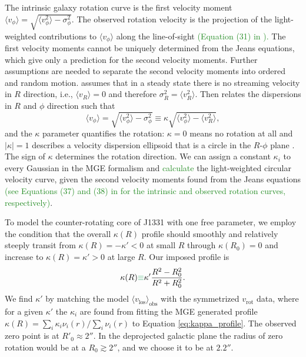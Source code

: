 \documentclass[useAMS,usenatbib]{mnras}
\newcommand*\diff{\mathop{}\!\mathrm{d}}
\newcommand{\NEW}[1]{\textcolor{ForestGreen}{#1}}
\newcommand{\OLD}[1]{}
\begin{document}
The intrinsic galaxy rotation curve is the first velocity moment $\langle v_\phi\rangle = \sqrt{\langle v_\phi^2 \rangle - \sigma_\phi^2}$. The observed rotation velocity is the projection of the light-weighted contributions to $\langle v_\phi\rangle$ along the line-of-sight \NEW{(Equation (31) in \citep{Cap08}).} \OLD{\citep{Cap08},
\begin{equation*}
I \langle v_\text{los}\rangle = \int_{-\infty}^{+\infty} \nu \langle v_\phi\rangle \cos \phi \sin i \diff z'.
\end{equation*}}
The first velocity moments cannot be uniquely determined from the Jeans equations, which give only a prediction for the second velocity moments. Further assumptions are needed to separate the second velocity moments into ordered and random motion. \citet{Cap08} assumes that in a steady state there is no streaming velocity in $R$ direction, i.e., $\langle v_R \rangle = 0$ and therefore $\sigma_R^2 = \langle v_R^2 \rangle$. Then \citet{Cap08} relates the dispersions in $R$ and $\phi$ direction such that
\begin{equation}
\langle v_\phi\rangle = \sqrt{\langle v_\phi^2 \rangle - \sigma_\phi^2} \equiv \kappa \sqrt{\langle v_\phi^2 \rangle - \langle v_R^2 \rangle},
\end{equation}
and the $\kappa$ parameter quantifies the rotation: $\kappa = 0$ means no rotation at all and $|\kappa| = 1$ describes a velocity dispersion ellipsoid that is a circle in the $R$-$\phi$ plane \citep{Cap08}. The sign of $\kappa$ determines the rotation direction. We can assign a constant $\kappa_i$ to every Gaussian in the MGE formalism and
\OLD{\begin{equation*}
\nu \langle v_\phi\rangle = \left[\nu \sum_{i=1}^N \kappa_i^2 \left( [\nu\langle v_\phi^2 \rangle]_i - [\nu\langle v_R^2 \rangle]_i\right) \right]^{1/2}
\end{equation*} 
is then}\NEW{calculate} the light-weighted circular velocity curve, given the second velocity moments found from the Jeans equations \NEW{(see Equations (37) and (38) in \citet{Cap08} for the intrinsic and observed rotation curves, respectively)}.

To model the counter-rotating core of J1331 with one free parameter, we employ the condition that the overall $\kappa(R)$ profile should smoothly and relatively steeply transit from $\kappa(R) = -\kappa' < 0$ at small $R$ through $\kappa(R_0) = 0$ and increase to $\kappa(R) = \kappa' > 0$ at large $R$. Our imposed profile is
\begin{equation}
\kappa(R) \OLD{=}\NEW{\equiv} \kappa' \frac{R^2 - R_0^2}{R^2 + R_0^2}. \label{eq:kappa_profile}
\end{equation}
We find $\kappa'$ by matching the model $\langle v_\text{los} \rangle_\text{obs}$ with the symmetrized $v_\text{rot}$ data, where for a given $\kappa'$ the $\kappa_i$ are found from fitting the MGE generated profile $\kappa(R) = \sum_i \kappa_i \nu_i(r)/\sum_i \nu_i(r)$ to Equation \eqref{eq:kappa_profile}. The observed zero point is at $R'_0\approx 2''$. In the deprojected galactic plane the radius of zero rotation would be at a $R_0 \gtrsim 2''$, and we choose it to be at $2.2''$.
\end{document}
